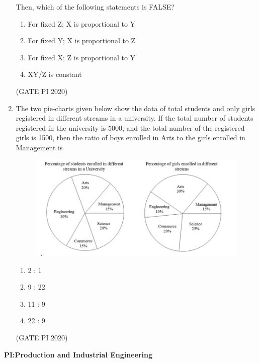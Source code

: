\documentclass[journal,12pt,onecolumn]{IEEEtran}
\theoremstyle{remark}
\begin{document}
\begin{enumerate}
Then, which of the following statements is FALSE?
\begin{enumerate}
    \item For fixed Z; X is proportional to Y
    \item For fixed Y; X is proportional to Z
    \item For fixed X; Z is proportional to Y
    \item XY/Z is constant
\end{enumerate}

\hfill (GATE PI 2020)

\item The two pie-charts given below show the data of total students and only girls registered in different streams in a university. If the total number of students registered in the university is 5000, and the total number of the registered girls is 1500, then the ratio of boys enrolled in Arts to the girls enrolled in Management is

\begin{figure}[h]
    \centering
    \includegraphics[width=0.5\columnwidth]{figs/fig4.png}
    \caption{}
    \label{fig:placeholder}
\end{figure}

\begin{enumerate}
    \item 2 : 1
    \item 9 : 22
    \item 11 : 9
    \item 22 : 9
\end{enumerate}

\hfill (GATE PI 2020)

\end{enumerate}
\textbf{PI:Production and Industrial Engineering}
\end{document}
